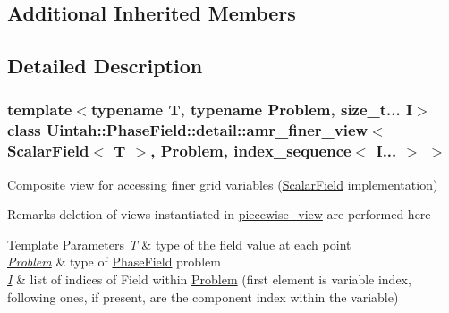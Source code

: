 \subsection*{Additional Inherited Members}


\subsection{Detailed Description}
\subsubsection*{template$<$typename T, typename Problem, size\+\_\+t... I$>$\newline
class Uintah\+::\+Phase\+Field\+::detail\+::amr\+\_\+finer\+\_\+view$<$ Scalar\+Field$<$ T $>$, Problem, index\+\_\+sequence$<$ I... $>$ $>$}

Composite view for accessing finer grid variables (\hyperlink{structUintah_1_1PhaseField_1_1ScalarField}{Scalar\+Field} implementation) 

\begin{DoxyRemark}{Remarks}
deletion of views instantiated in \hyperlink{classUintah_1_1PhaseField_1_1detail_1_1piecewise__view}{piecewise\+\_\+view} are performed here
\end{DoxyRemark}

\begin{DoxyTemplParams}{Template Parameters}
{\em T} & type of the field value at each point \\
\hline
{\em \hyperlink{classUintah_1_1PhaseField_1_1Problem}{Problem}} & type of \hyperlink{namespaceUintah_1_1PhaseField}{Phase\+Field} problem \\
\hline
{\em \hyperlink{structUintah_1_1PhaseField_1_1I}{I}} & list of indices of Field within \hyperlink{classUintah_1_1PhaseField_1_1Problem}{Problem} (first element is variable index, following ones, if present, are the component index within the variable) \\
\hline
\end{DoxyTemplParams}


